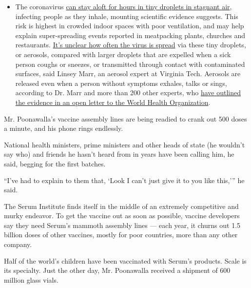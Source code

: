 \begin{itemize}
  \begin{itemize}
  \tightlist
  \item
    The coronavirus
    \href{https://www.nytimes3xbfgragh.onion/2020/07/04/health/239-experts-with-one-big-claim-the-coronavirus-is-airborne.html?action=click\&pgtype=Article\&state=default\&region=MAIN_CONTENT_3\&context=storylines_faq}{can
    stay aloft for hours in tiny droplets in stagnant air}, infecting
    people as they inhale, mounting scientific evidence suggests. This
    risk is highest in crowded indoor spaces with poor ventilation, and
    may help explain super-spreading events reported in meatpacking
    plants, churches and restaurants.
    \href{https://www.nytimes3xbfgragh.onion/2020/07/06/health/coronavirus-airborne-aerosols.html?action=click\&pgtype=Article\&state=default\&region=MAIN_CONTENT_3\&context=storylines_faq}{It's
    unclear how often the virus is spread} via these tiny droplets, or
    aerosols, compared with larger droplets that are expelled when a
    sick person coughs or sneezes, or transmitted through contact with
    contaminated surfaces, said Linsey Marr, an aerosol expert at
    Virginia Tech. Aerosols are released even when a person without
    symptoms exhales, talks or sings, according to Dr. Marr and more
    than 200 other experts, who
    \href{https://academic.oup.com/cid/article/doi/10.1093/cid/ciaa939/5867798}{have
    outlined the evidence in an open letter to the World Health
    Organization}.
  \end{itemize}
\end{itemize}

Mr. Poonawalla's vaccine assembly lines are being readied to crank out
500 doses a minute, and his phone rings endlessly.

National health ministers, prime ministers and other heads of state (he
wouldn't say who) and friends he hasn't heard from in years have been
calling him, he said, begging for the first batches.

``I've had to explain to them that, `Look I can't just give it to you
like this,''' he said.

The Serum Institute finds itself in the middle of an extremely
competitive and murky endeavor. To get the vaccine out as soon as
possible, vaccine developers say they need Serum's mammoth assembly
lines --- each year, it churns out 1.5 billion doses of other vaccines,
mostly for poor countries, more than any other company.

Half of the world's children have been vaccinated with Serum's products.
Scale is its specialty. Just the other day, Mr. Poonawalla received a
shipment of 600 million glass vials.

